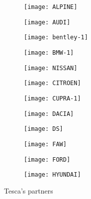 \begin{figure}[htbp]
\centering
\begin{subfigure}{0.16\textwidth}
  \centering
  \texttt{[image: ALPINE]}
\end{subfigure}%
\begin{subfigure}{0.16\textwidth}
  \centering
  \texttt{[image: AUDI]}
\end{subfigure}%
\begin{subfigure}{0.16\textwidth}
  \centering
  \texttt{[image: bentley-1]}
\end{subfigure}%
\begin{subfigure}{0.16\textwidth}
  \centering
  \texttt{[image: BMW-1]}
\end{subfigure}%
\begin{subfigure}{0.16\textwidth}
  \centering
  \texttt{[image: NISSAN]}
\end{subfigure}%
\begin{subfigure}{0.16\textwidth}
  \centering
  \texttt{[image: CITROEN]}
\end{subfigure}

\vspace{10pt} %

\begin{subfigure}{0.16\textwidth}
  \centering
  \texttt{[image: CUPRA-1]}
\end{subfigure}%
\begin{subfigure}{0.16\textwidth}
  \centering
  \texttt{[image: DACIA]}
\end{subfigure}%
\begin{subfigure}{0.16\textwidth}
  \centering
  \texttt{[image: DS]}
\end{subfigure}%
\begin{subfigure}{0.16\textwidth}
  \centering
  \texttt{[image: FAW]}
\end{subfigure}%
\begin{subfigure}{0.16\textwidth}
  \centering
  \texttt{[image: FORD]}
\end{subfigure}%
\begin{subfigure}{0.16\textwidth}
  \centering
  \texttt{[image: HYUNDAI]}
\end{subfigure}

\caption{Tesca's partners}
\end{figure}





